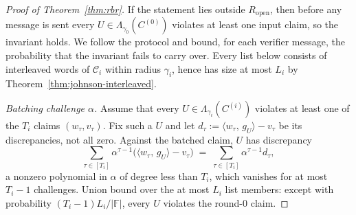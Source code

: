 \documentclass[11pt]{article}
\newcommand{\F}{\mathbb{F}}
\newcommand{\Lam}{\Lambda}
\newcommand{\inner}[2]{\langle #1,\, #2 \rangle}
\theoremstyle{plain}
\theoremstyle{definition}
\theoremstyle{remark}
\begin{document}
\begin{proof}[Proof of Theorem~\ref{thm:rbr}]
If the statement lies outside $R_{\mathrm{open}}$, then before any message is sent every $U \in \Lam_{\gamma_0}(C^{(0)})$ violates at least one input claim, so the invariant holds. We follow the protocol and bound, for each verifier message, the probability that the invariant fails to carry over. Every list below consists of interleaved words of $\mathcal{C}_i$ within radius $\gamma_i$, hence has size at most $L_i$ by Theorem~\ref{thm:johnson-interleaved}.

\medskip\noindent\emph{Batching challenge $\alpha$.}
Assume that every $U \in \Lam_{\gamma_i}(C^{(i)})$ violates at least one of the $T_i$ claims $(w_\tau, v_\tau)$. Fix such a $U$ and let $d_\tau := \inner{w_\tau}{g_U} - v_\tau$ be its discrepancies, not all zero. Against the batched claim, $U$ has discrepancy
\[
\sum_{\tau \in [T_i]} \alpha^{\tau - 1} \bigl( \inner{w_\tau}{g_U} - v_\tau \bigr) \;=\; \sum_{\tau \in [T_i]} \alpha^{\tau - 1} d_\tau ,
\]
a nonzero polynomial in $\alpha$ of degree less than $T_i$, which vanishes for at most $T_i - 1$ challenges. Union bound over the at most $L_i$ list members: except with probability $(T_i - 1) L_i / |\F|$, every $U$ violates the round-$0$ claim.


\end{proof}
\end{document}
